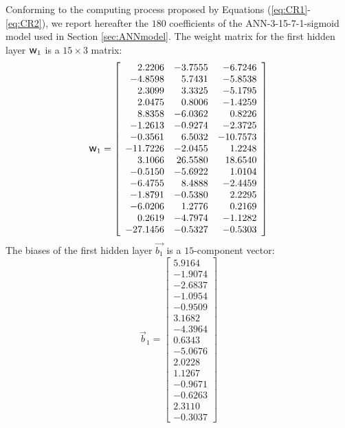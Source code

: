 \documentclass[metals,article,submit,pdftex,moreauthors]{Definitions/mdpi}
\DeclareRobustCommand{\w}{\mbox{\large\ensuremath{\mathsf{w}}}}
\begin{document}
Conforming to the computing process proposed by Equations (\ref{eq:CR1}-\ref{eq:CR2}), we report hereafter the $180$ coefficients of the ANN-3-15-7-1-sigmoid model used in Section \ref{sec:ANNmodel}.
The weight matrix for the first hidden layer $\w_1$ is a $15\times3$ matrix:
\begin{equation*}
\w_1 = \left[
\begin{array}{rrr}
	2.2206   & -3.7555 & -6.7246  \\
	-4.8598  & 5.7431  & -5.8538  \\
	2.3099   & 3.3325  & -5.1795  \\
	2.0475   & 0.8006  & -1.4259  \\
	8.8358   & -6.0362 & 0.8226   \\
	-1.2613  & -0.9274 & -2.3725  \\
	-0.3561  & 6.5032  & -10.7573 \\
	-11.7226 & -2.0455 & 1.2248   \\
	3.1066   & 26.5580 & 18.6540  \\
	-0.5150  & -5.6922 & 1.0104   \\
	-6.4755  & 8.4888  & -2.4459  \\
	-1.8791  & -0.5380 & 2.2295   \\
	-6.0206  & 1.2776  & 0.2169   \\
	0.2619   & -4.7974 & -1.1282  \\
	-27.1456 & -0.5327 & -0.5303
\end{array}\right]
\end{equation*}
The biases of the first hidden layer $\overrightarrow{b_1}$ is a $15$-component vector:
\begin{equation*}
\overrightarrow{b}_1 = \left[
\begin{array}{r}
	5.9164  \\
	-1.9074 \\
	-2.6837 \\
	-1.0954 \\
	-0.9509 \\
	3.1682  \\
	-4.3964 \\
	0.6343  \\
	-5.0676 \\
	2.0228  \\
	1.1267  \\
	-0.9671 \\
	-0.6263 \\
	2.3110  \\
	-0.3037
\end{array}\right]
\end{equation*}
\end{document}
